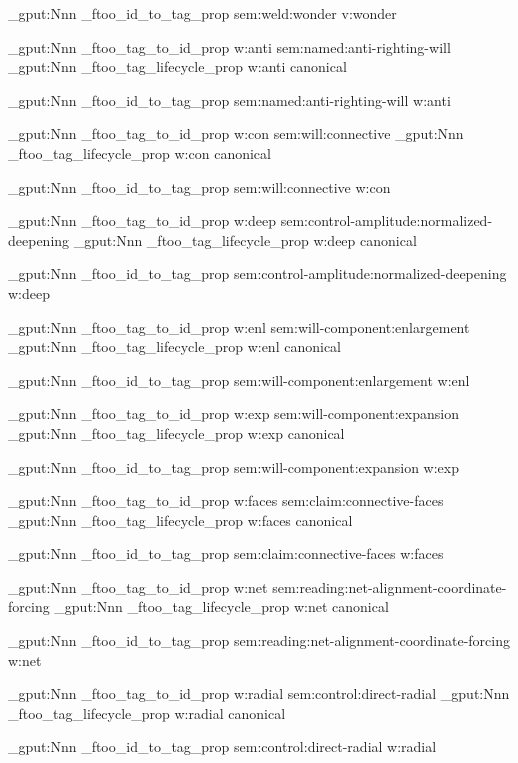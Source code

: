 \prop_gput:Nnn \g_ftoo_id_to_tag_prop { sem:weld:wonder } { v:wonder }


\prop_gput:Nnn \g_ftoo_tag_to_id_prop { w:anti } { sem:named:anti-righting-will }
\prop_gput:Nnn \g_ftoo_tag_lifecycle_prop { w:anti } { canonical }

\prop_gput:Nnn \g_ftoo_id_to_tag_prop { sem:named:anti-righting-will } { w:anti }


\prop_gput:Nnn \g_ftoo_tag_to_id_prop { w:con } { sem:will:connective }
\prop_gput:Nnn \g_ftoo_tag_lifecycle_prop { w:con } { canonical }

\prop_gput:Nnn \g_ftoo_id_to_tag_prop { sem:will:connective } { w:con }


\prop_gput:Nnn \g_ftoo_tag_to_id_prop { w:deep } { sem:control-amplitude:normalized-deepening }
\prop_gput:Nnn \g_ftoo_tag_lifecycle_prop { w:deep } { canonical }

\prop_gput:Nnn \g_ftoo_id_to_tag_prop { sem:control-amplitude:normalized-deepening } { w:deep }


\prop_gput:Nnn \g_ftoo_tag_to_id_prop { w:enl } { sem:will-component:enlargement }
\prop_gput:Nnn \g_ftoo_tag_lifecycle_prop { w:enl } { canonical }

\prop_gput:Nnn \g_ftoo_id_to_tag_prop { sem:will-component:enlargement } { w:enl }


\prop_gput:Nnn \g_ftoo_tag_to_id_prop { w:exp } { sem:will-component:expansion }
\prop_gput:Nnn \g_ftoo_tag_lifecycle_prop { w:exp } { canonical }

\prop_gput:Nnn \g_ftoo_id_to_tag_prop { sem:will-component:expansion } { w:exp }


\prop_gput:Nnn \g_ftoo_tag_to_id_prop { w:faces } { sem:claim:connective-faces }
\prop_gput:Nnn \g_ftoo_tag_lifecycle_prop { w:faces } { canonical }

\prop_gput:Nnn \g_ftoo_id_to_tag_prop { sem:claim:connective-faces } { w:faces }


\prop_gput:Nnn \g_ftoo_tag_to_id_prop { w:net } { sem:reading:net-alignment-coordinate-forcing }
\prop_gput:Nnn \g_ftoo_tag_lifecycle_prop { w:net } { canonical }

\prop_gput:Nnn \g_ftoo_id_to_tag_prop { sem:reading:net-alignment-coordinate-forcing } { w:net }


\prop_gput:Nnn \g_ftoo_tag_to_id_prop { w:radial } { sem:control:direct-radial }
\prop_gput:Nnn \g_ftoo_tag_lifecycle_prop { w:radial } { canonical }

\prop_gput:Nnn \g_ftoo_id_to_tag_prop { sem:control:direct-radial } { w:radial }



